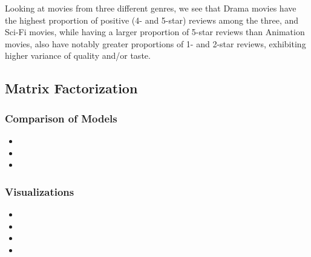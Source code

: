 \begin{itemize}
        Looking at movies from three different genres, we see that Drama movies have the highest proportion of positive (4- and 5-star) reviews among the three, and Sci-Fi movies, while having a larger proportion of 5-star reviews than Animation movies, also have notably greater proportions of 1- and 2-star reviews, exhibiting higher variance of quality and/or taste.

\end{itemize}

\subsection{Matrix Factorization}
\subsubsection{Comparison of Models}
\begin{itemize}
    \item {}
    \item {}
    \item {}
\end{itemize}

\subsubsection{Visualizations}
\begin{itemize}
    \item {}
    \item {}
    \item {}
    \item {}
\end{itemize}

